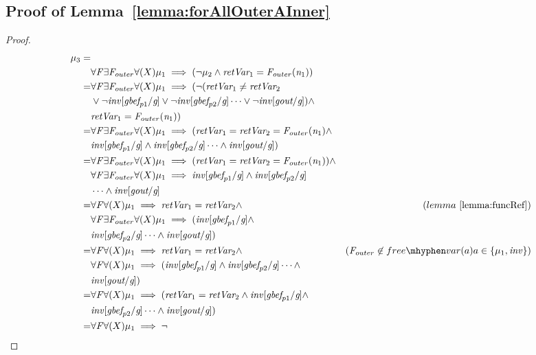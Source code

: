 \documentclass{llncs}
\newcommand{\inv}{\mathit{inv}}
\newcommand{\retVar}{\textit{retVar}}
\newcommand{\F}{\mathit{F}}
\newcommand{\n}{\textit{n}}
\newcommand{\g}{\textit{g}}
\newcommand{\gout}{\textit{gout}}
\newcommand{\gbef}{\textit{gbef}}
\newcommand{\formula}{\mu}
\begin{document}
\begin{subappendices}
\section{Proof of Lemma~\ref{lemma:forAllOuterAInner}}
\begin{proof}
\begin{align*}
  \formula_3 =&\\
  &\forall \F \exists \F_{outer} \forall (X) \formula_1
  \implies (\neg \formula_2 \wedge \retVar_1 = \F_{outer}(\n_1))\\
=&\forall \F \exists \F_{outer} \forall (X) \formula_1 \implies
(\neg(\retVar_1 \neq \retVar_2 \\
&\vee \neg\inv[\gbef_{p1}/\g] \vee \neg\inv[\gbef_{p2}/\g] \cdots 
\vee \neg\inv[\gout/\g]) \wedge\\
&\retVar_1 = \F_{outer}(\n_1))\\
=&\forall \F \exists \F_{outer} \forall (X) \formula_1 \implies
(\retVar_1 = \retVar_2 = \F_{outer}(\n_1) \wedge\\
&\inv[\gbef_{p1}/\g] \wedge \inv[\gbef_{p2}/\g] \cdots \wedge \inv[\gout/\g])\\
=&\forall \F \exists \F_{outer} \forall (X) \formula_1 \implies
(\retVar_1 = \retVar_2 = \F_{outer}(\n_1)) \wedge\\
&\forall \F \exists \F_{outer} \forall (X) \formula_1 \implies
\inv[\gbef_{p1}/\g] \wedge
\inv[\gbef_{p2}/\g]\\
&\cdots \wedge \inv[\gout/\g]\\
=&\forall \F \forall (X) \formula_1 \implies
\retVar_1 = \retVar_2 \wedge  &(lemma~\ref{lemma:funcRef})\\
&  \forall \F \exists \F_{outer} \forall (X) \formula_1 \implies (
\inv[\gbef_{p1}/\g] \wedge \\
&\inv[\gbef_{p2}/\g] \cdots \wedge \inv[\gout/\g])\\
=&\forall \F \forall (X) \formula_1 \implies
\retVar_1 = \retVar_2 \wedge &(\F_{outer} \not \in free\mhyphen
var(a) a \in \{\formula_1, \inv\})\\
&\forall \F \forall (X) \formula_1 \implies (
\inv[\gbef_{p1}/\g] \wedge \inv[\gbef_{p2}/\g] \cdots \wedge\\
&\inv[\gout/\g])\\
=&\forall \F \forall (X) \formula_1 \implies (
\retVar_1 = \retVar_2 \wedge \inv[\gbef_{p1}/\g] \wedge \\
&\inv[\gbef_{p2}/\g] \cdots \wedge \inv[\gout/\g])\\
=&\forall \F \forall (X) \formula_1 \implies \neg

\end{align*}
\end{proof}
\end{subappendices}
\end{document}
